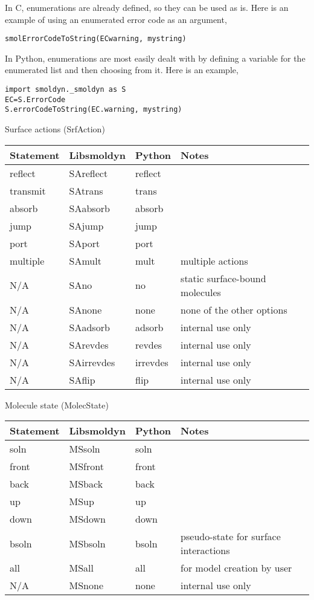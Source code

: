 \documentclass {book}
\begin{document}
In C, enumerations are already defined, so they can be used as is. Here is an example of using an enumerated error code as an argument, 
\begin{lstlisting}
smolErrorCodeToString(ECwarning, mystring)
\end{lstlisting}

In Python, enumerations are most easily dealt with by defining a variable for the enumerated list and then choosing from it. Here is an example, 
\begin{lstlisting}
import smoldyn._smoldyn as S
EC=S.ErrorCode
S.errorCodeToString(EC.warning, mystring)
\end{lstlisting}

Surface actions (SrfAction)
\begin{longtable}[c]{llll}
Statement & Libsmoldyn & Python & Notes\\
\hline
reflect & SAreflect & reflect\\
transmit & SAtrans & trans\\
absorb & SAabsorb & absorb\\
jump & SAjump & jump\\
port & SAport & port\\
multiple & SAmult & mult & multiple actions\\
N/A & SAno & no & static surface-bound molecules\\
N/A & SAnone & none & none of the other options\\
N/A & SAadsorb & adsorb & internal use only\\
N/A & SArevdes & revdes & internal use only\\
N/A & SAirrevdes & irrevdes & internal use only\\
N/A & SAflip & flip & internal use only
\end{longtable}

Molecule state (MolecState)
\begin{longtable}[c]{llll}
Statement & Libsmoldyn & Python & Notes\\
\hline
soln & MSsoln & soln\\
front & MSfront & front\\
back & MSback & back\\
up & MSup & up\\
down & MSdown & down\\
bsoln & MSbsoln & bsoln & pseudo-state for surface interactions\\
all & MSall & all & for model creation by user\\
N/A & MSnone & none & internal use only
\end{longtable}
\end{document}
